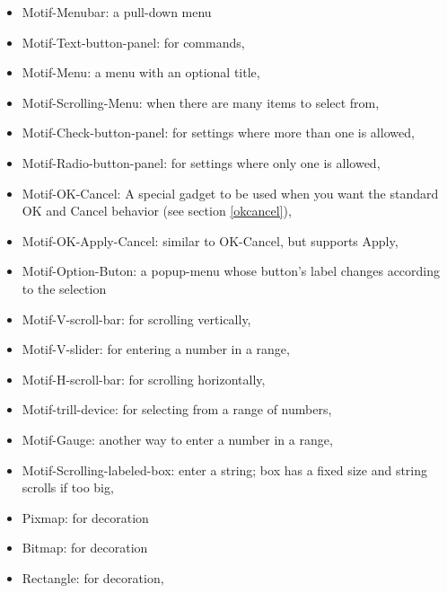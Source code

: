 \begin{itemize}
\item Motif-Menubar: a pull-down menu

\item Motif-Text-button-panel: for commands,

\item Motif-Menu: a menu with an optional title,

\item Motif-Scrolling-Menu: when there are many items to select from,

\item Motif-Check-button-panel: for settings where more than one is allowed,

\item Motif-Radio-button-panel: for settings where only one is allowed,

\item Motif-OK-Cancel: A special gadget to be used when you want the standard OK and
Cancel behavior (see section \ref{okcancel}),

\item Motif-OK-Apply-Cancel: similar to OK-Cancel, but supports Apply,

\item Motif-Option-Buton: a popup-menu whose button's label changes according to the
selection

\item Motif-V-scroll-bar: for scrolling vertically,

\item Motif-V-slider: for entering a number in a range,

\item Motif-H-scroll-bar: for scrolling horizontally,

\item Motif-trill-device: for selecting from a range of numbers,

\item Motif-Gauge: another way to enter a number in a range,

\item Motif-Scrolling-labeled-box: enter a string; box has a fixed size and string
scrolls if too big,

\item Pixmap: for decoration

\item Bitmap: for decoration

\item Rectangle: for decoration,


\end{itemize}
